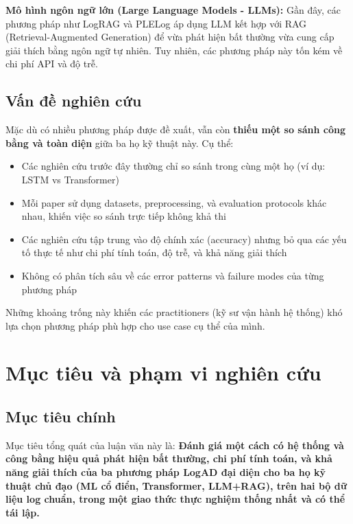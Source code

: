\textbf{Mô hình ngôn ngữ lớn (Large Language Models - LLMs):} Gần đây, các phương pháp như LogRAG \cite{jiang2024lograg} và PLELog \cite{le2023plelog} áp dụng LLM kết hợp với RAG (Retrieval-Augmented Generation) để vừa phát hiện bất thường vừa cung cấp giải thích bằng ngôn ngữ tự nhiên. Tuy nhiên, các phương pháp này tốn kém về chi phí API và độ trễ.

\subsection{Vấn đề nghiên cứu}

Mặc dù có nhiều phương pháp được đề xuất, vẫn còn \textbf{thiếu một so sánh công bằng và toàn diện} giữa ba họ kỹ thuật này. Cụ thể:

\begin{itemize}
    \item Các nghiên cứu trước đây thường chỉ so sánh trong cùng một họ (ví dụ: LSTM vs Transformer)
    \item Mỗi paper sử dụng datasets, preprocessing, và evaluation protocols khác nhau, khiến việc so sánh trực tiếp không khả thi
    \item Các nghiên cứu tập trung vào độ chính xác (accuracy) nhưng bỏ qua các yếu tố thực tế như chi phí tính toán, độ trễ, và khả năng giải thích
    \item Không có phân tích sâu về các error patterns và failure modes của từng phương pháp
\end{itemize}

Những khoảng trống này khiến các practitioners (kỹ sư vận hành hệ thống) khó lựa chọn phương pháp phù hợp cho use case cụ thể của mình.

\section{Mục tiêu và phạm vi nghiên cứu}
\label{sec:objectives}

\subsection{Mục tiêu chính}

Mục tiêu tổng quát của luận văn này là: \textbf{Đánh giá một cách có hệ thống và công bằng hiệu quả phát hiện bất thường, chi phí tính toán, và khả năng giải thích của ba phương pháp LogAD đại diện cho ba họ kỹ thuật chủ đạo (ML cổ điển, Transformer, LLM+RAG), trên hai bộ dữ liệu log chuẩn, trong một giao thức thực nghiệm thống nhất và có thể tái lập.}

